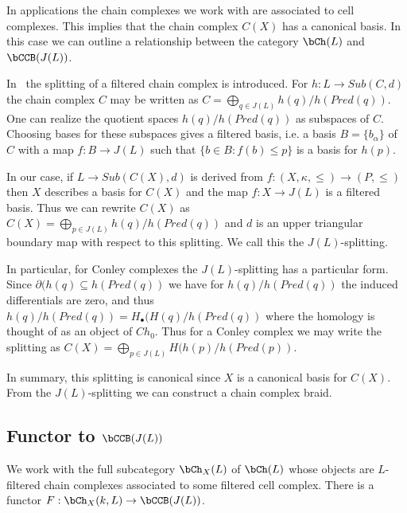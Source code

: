 In applications the chain complexes we work with are associated to cell complexes.  This implies that the chain complex $C(X)$ has a canonical basis. In this case we can outline a relationship between the category $\bCh(L)$ and $\bCCB(J(L))$.


In~\cite[Section 7]{salamon} the splitting of a filtered chain complex is introduced.   For $h:L\to Sub(C,d)$ the chain complex $C$ may be written as $C=\bigoplus_{q\in J(L)} h(q)/h(Pred(q))$.  One can realize the quotient spaces $h(q)/h(Pred(q))$ as subspaces of $C$.  Choosing bases for these subspaces gives a filtered basis, i.e. a basis $B=\{b_\alpha\}$ of $C$ with a map $f:B\to J(L)$ such that $\{b\in B: f(b)\leq p\}$ is a basis for $h(p)$.

In our case, if $L\to Sub(C(X),d)$ is derived from $f:(X,\kappa,\leq)\to (P,\leq)$ then $X$ describes a basis for $C(X)$ and the map $f:X\to J(L)$ is a filtered basis.   Thus we can rewrite $C(X)$ as $C(X)=\bigoplus_{p\in J(L)} h(q)/h(Pred(q))$ and $d$ is an upper triangular boundary map with respect to this splitting.  We call this the $J(L)$-splitting.


In particular, for Conley complexes the $J(L)$-splitting has a particular form.  Since $\partial(h(q)\subseteq h(Pred(q))$ we have for $h(q)/h(Pred(q))$ the induced differentials are zero, and thus $h(q)/h(Pred(q)) = H_\bullet(H(q)/h(Pred(q))$ where the homology is thought of as an object of $Ch_0$.  Thus for a Conley complex we may write the splitting as $C(X) = \bigoplus_{p\in J(L)} H(h(p)/h(Pred(p))$.


In summary, this splitting is canonical since $X$ is a canonical basis for $C(X)$.  From the $J(L)$-splitting we can construct a chain complex braid.







\subsection{Functor to $\bCCB(J(L))$}

We work with the full subcategory $\bCh_X(L)$ of $\bCh(L)$ whose objects are $L$-filtered chain complexes associated to some filtered cell complex.  There is a functor $F:\bCh_X(k,L)\to \bCCB(J(L))$.

